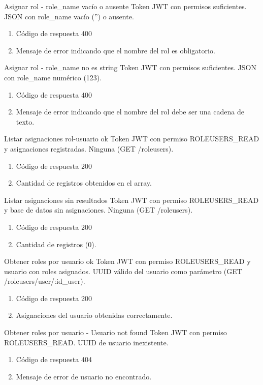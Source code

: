 {Asignar rol - role\_name vacío o ausente}
{Token JWT con permisos suficientes.}
{JSON con role\_name vacío ('') o ausente.}
{\begin{enumerate} [leftmargin=*, nosep]
    \item Código de respuesta 400
    \item Mensaje de error indicando que el nombre del rol es obligatorio.
\end{enumerate}}

{Asignar rol - role\_name no es string}
{Token JWT con permisos suficientes.}
{JSON con role\_name numérico (123).}
{\begin{enumerate} [leftmargin=*, nosep]
    \item Código de respuesta 400
    \item Mensaje de error indicando que el nombre del rol debe ser una cadena de texto.
\end{enumerate}}

{Listar asignaciones rol-usuario ok}
{Token JWT con permiso ROLEUSERS\_READ y asignaciones registradas.}
{Ninguna (GET /roleusers).}
{\begin{enumerate} [leftmargin=*, nosep]
    \item Código de respuesta 200
    \item Cantidad de registros obtenidos en el array.
\end{enumerate}}

{Listar asignaciones sin resultados}
{Token JWT con permiso ROLEUSERS\_READ y base de datos sin asignaciones.}
{Ninguna (GET /roleusers).}
{\begin{enumerate} [leftmargin=*, nosep]
    \item Código de respuesta 200
    \item Cantidad de registros (0).
\end{enumerate}}

{Obtener roles por usuario ok}
{Token JWT con permiso ROLEUSERS\_READ y usuario con roles asignados.}
{UUID válido del usuario como parámetro (GET /roleusers/user/:id\_user).}
{\begin{enumerate} [leftmargin=*, nosep]
    \item Código de respuesta 200
    \item Asignaciones del usuario obtenidas correctamente.
\end{enumerate}}

{Obtener roles por usuario - Usuario not found}
{Token JWT con permiso ROLEUSERS\_READ.}
{UUID de usuario inexistente.}
{\begin{enumerate} [leftmargin=*, nosep]
    \item Código de respuesta 404
    \item Mensaje de error de usuario no encontrado.
\end{enumerate}}

